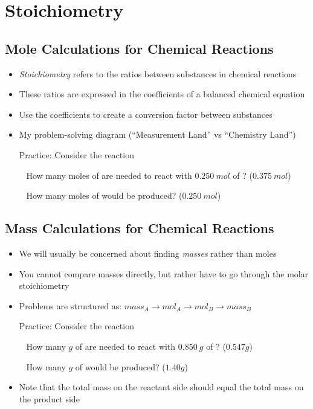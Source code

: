 \documentclass[12pt, openany, letterpaper]{memoir}
\begin{document}
\chapter{Stoichiometry}
\section{Mole Calculations for Chemical Reactions}
\begin{itemize}
	\item \emph{Stoichiometry} refers to the ratios between substances in chemical reactions
	\item These ratios are expressed in the coefficients of a balanced chemical equation
	\item Use the coefficients to create a conversion factor between substances
	\item My problem-solving diagram (``Measurement Land'' vs ``Chemistry Land'')
	
	Practice: Consider the reaction 
	
	~\hphantom{Practice:} How many moles of  are needed to react with $0.250~mol$ of ? \hspace{1em} ($0.375~mol$)
	
	~\hphantom{Practice:} How many moles of  would be produced? \hspace{1em} ($0.250~mol$)
\end{itemize}
\section{Mass Calculations for Chemical Reactions}
\begin{itemize}
	\item We will usually be concerned about finding \emph{masses} rather than moles
	\item You cannot compare masses directly, but rather have to go through the molar stoichiometry
	\item Problems are structured as: $mass_A\rightarrow mol_A\rightarrow mol_B\rightarrow mass_B$ 
	
	Practice: Consider the reaction 
	
	~\hphantom{Practice:} How many $g$ of  are needed to react with $0.850~g$ of ? \hspace{1em} ($0.547g$)
	
	~\hphantom{Practice:} How many $g$ of  would be produced? \hspace{1em} ($1.40g$)
	
	\item Note that the total mass on the reactant side should equal the total mass on the product side
\end{itemize}
\end{document}
